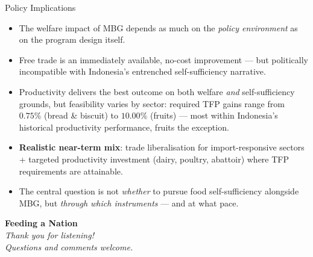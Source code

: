 \documentclass[11pt,aspectratio=169]{beamer}
\begin{document}
\begin{frame}{Policy Implications}
\footnotesize
\begin{itemize}\setlength\itemsep{9pt}
	\item The welfare impact of MBG depends as much on the \emph{policy environment} as on the program design itself.
	\item Free trade is an immediately available, no-cost improvement --- but politically incompatible with Indonesia's entrenched self-sufficiency narrative.
	\item Productivity delivers the best outcome on both welfare \emph{and} self-sufficiency grounds, but feasibility varies by sector: required TFP gains range from $0.75\%$ (bread \& biscuit) to $10.00\%$ (fruits) --- most within Indonesia's historical productivity performance, fruits the exception.
	\item \textbf{Realistic near-term mix}: trade liberalisation for import-responsive sectors + targeted productivity investment (dairy, poultry, abattoir) where TFP requirements are attainable.
	\item The central question is not \emph{whether} to pursue food self-sufficiency alongside MBG, but \emph{through which instruments} --- and at what pace.
\end{itemize}
\end{frame}

\begin{frame}[c]
\centering
{\Large\textcolor{lubrown}{\textbf{Feeding a Nation}}}\\[10pt]
{\large\textit{Thank you for listening!\\[4pt] Questions and comments welcome.}}
\end{frame}
\end{document}
